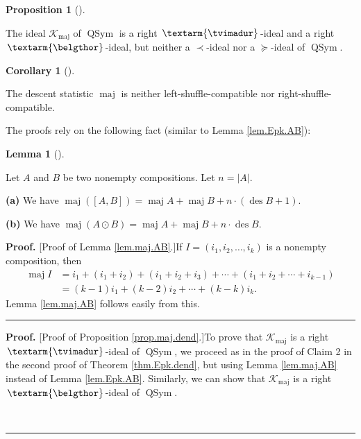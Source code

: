 \documentclass[numbers=enddot,12pt,final,onecolumn,notitlepage]{scrartcl}%
\theoremstyle{definition}
\newtheorem{lem}[theo]{Lemma}
\newenvironment{lemma}[1][]
{\begin{lem}[#1]\begin{leftbar}}
{\end{leftbar}\end{lem}}
\newtheorem{prop}[theo]{Proposition}
\newenvironment{proposition}[1][]
{\begin{prop}[#1]\begin{leftbar}}
{\end{leftbar}\end{prop}}
\newtheorem{coro}[theo]{Corollary}
\newenvironment{corollary}[1][]
{\begin{coro}[#1]\begin{leftbar}}
{\end{leftbar}\end{coro}}
\newenvironment{proof}[1][Proof]{\noindent\textbf{#1.} }{\ \rule{0.5em}{0.5em}}
\newenvironment{verlong}{}{}
\newcommand{\tvi}{\left. \textarm{\tvimadur} \right.}
\newcommand{\bel}{\left. \textarm{\belgthor} \right.}
\begin{document}
\begin{verlong}
\begin{proposition}
\label{prop.maj.dend}The ideal $\mathcal{K}_{\operatorname*{maj}}$ of
$\operatorname*{QSym}$ is a right $\tvi$-ideal and a right $\bel$-ideal, but
neither a $\left.  \prec\right.  $-ideal nor a $\left.  \succeq\right.
$-ideal of $\operatorname*{QSym}$.
\end{proposition}

\begin{corollary}
\label{cor.dendri.maj}The descent statistic $\operatorname*{maj}$ is neither
left-shuffle-compatible nor right-shuffle-compatible.
\end{corollary}

The proofs rely on the following fact (similar to Lemma \ref{lem.Epk.AB}):

\begin{lemma}
\label{lem.maj.AB}Let $A$ and $B$ be two nonempty compositions. Let
$n=\left\vert A\right\vert $.

\textbf{(a)} We have $\operatorname*{maj}\left(  \left[  A,B\right]  \right)
=\operatorname*{maj}A+\operatorname*{maj}B+n\cdot\left(  \operatorname*{des}%
B+1\right)  $.

\textbf{(b)} We have $\operatorname*{maj}\left(  A\odot B\right)
=\operatorname*{maj}A+\operatorname*{maj}B+n\cdot\operatorname*{des}B$.
\end{lemma}

\begin{proof}
[Proof of Lemma \ref{lem.maj.AB}.]If $I=\left(  i_{1},i_{2},\ldots
,i_{k}\right)  $ is a nonempty composition, then
\begin{align*}
\operatorname*{maj}I  &  =i_{1}+\left(  i_{1}+i_{2}\right)  +\left(
i_{1}+i_{2}+i_{3}\right)  +\cdots+\left(  i_{1}+i_{2}+\cdots+i_{k-1}\right) \\
&  =\left(  k-1\right)  i_{1}+\left(  k-2\right)  i_{2}+\cdots+\left(
k-k\right)  i_{k}.
\end{align*}
Lemma \ref{lem.maj.AB} follows easily from this.
\end{proof}

\begin{proof}
[Proof of Proposition \ref{prop.maj.dend}.]To prove that $\mathcal{K}%
_{\operatorname*{maj}}$ is a right $\tvi$-ideal of $\operatorname*{QSym}$, we
proceed as in the proof of Claim 2 in the second proof of Theorem
\ref{thm.Epk.dend}, but using Lemma \ref{lem.maj.AB} instead of Lemma
\ref{lem.Epk.AB}. Similarly, we can show that $\mathcal{K}%
_{\operatorname*{maj}}$ is a right $\bel$-ideal of $\operatorname*{QSym}$.


\end{proof}
\end{verlong}
\end{document}
